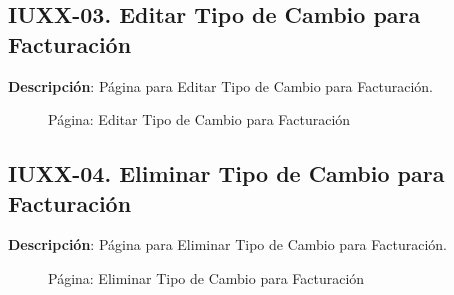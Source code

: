 \clearpage
\subsection{IUXX-03. Editar Tipo de Cambio para Facturación} \label{sec:ui-page-update-tipocambiofacturacion}

\textbf{Descripción}: Página para Editar Tipo de Cambio para Facturación.\\

\begin{figure}[H]
	\label{tab:ui-edit-tipocambiofacturacion-page}
	\caption{Página: Editar Tipo de Cambio para Facturación}
\end{figure}

\begin{table}[H]
	\caption{Forma: Editar Tipo de Cambio para Facturación}
	\label{tab:ui-update-tipocambiofacturacion-form}
\end{table}

\clearpage
\subsection{IUXX-04. Eliminar Tipo de Cambio para Facturación} \label{sec:ui-page-delete-tipocambiofacturacion}

\textbf{Descripción}: Página para Eliminar Tipo de Cambio para Facturación.\\

\begin{figure}[H]
	\label{tab:ui-delete-tipocambiofacturacion-page}
	\caption{Página: Eliminar Tipo de Cambio para Facturación}
\end{figure}

